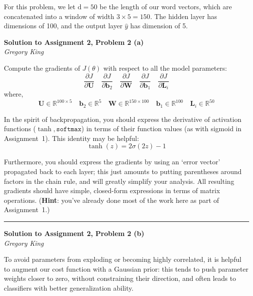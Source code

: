 \documentclass[letter,12pt]{article}
\newcommand{\myhwtitle}[3]
{\begin{center}
{\large {\bf Solution to Assignment {#1}, Problem {#2}}}\\
\medskip 
{\it {#3}} %
\end{center}}
\newcommand{\solutionsAuthor}{Gregory King}
\begin{document}
\noindent For this problem, we let $\textrm{d} = 50$ be the length of our word vectors, which are concatenated into a window of width $3\times5=150$. The hidden layer has dimensions of 100, and the output layer $\hat{y}$ has dimension of 5.

\myhwtitle{2}{2 (a)}{\solutionsAuthor}

\noindent Compute the gradients of $J(\theta)$ with respect to all the model parameters:\\
\begin{equation}
\frac{\partial J}{\partial{\boldsymbol U}}\quad\frac{\partial J}{\partial{\boldsymbol b}_{2}}\quad\frac{\partial J}{\partial{\boldsymbol W}}\quad\frac{\partial J}{\partial{\boldsymbol b}_{1}}\quad\frac{\partial J}{\partial{\boldsymbol L}_{i}}
\end{equation}
where,\\
\begin{equation}
{\boldsymbol U}\in\mathbb{R}^{100\times5}\quad{\boldsymbol b}_{2}\in\mathbb{R}^{5}\quad{\boldsymbol W}\in\mathbb{R}^{150\times100}\quad{\boldsymbol b}_{1}\in\mathbb{R}^{100}\quad{\boldsymbol L}_{i}\in\mathbb{R}^{50}
\end{equation}

\noindent In the spirit of backpropagation, you should express the derivative of activation functions ($\tanh,\texttt{softmax}$) in terms of their function values (as with sigmoid in Assignment~1). This identity may be helpful:\\
\begin{equation}
\tanh(z) = 2\sigma(2z)-1
\end{equation}

\noindent Furthermore, you should express the gradients by using an `error vector' propagated back to each layer; this just amounts to putting parentheses around factors in the chain rule, and will greatly simplify your analysis. All resulting gradients should have simple, closed-form expressions in terms of matrix operations. (\textbf{Hint}: you've already done most of the work here as part of Assignment~1.)

\vspace{5mm}
\noindent\rule{\textwidth}{0.4pt}

\clearpage

\myhwtitle{2}{2 (b)}{\solutionsAuthor}

\bigskip

\noindent To avoid parameters from exploding or becoming highly correlated, it is helpful to augment our cost function with a Gaussian prior: this tends to push parameter weights closer to zero, without constraining their direction, and often leads to classifiers with better generalization ability.\\
\end{document}

